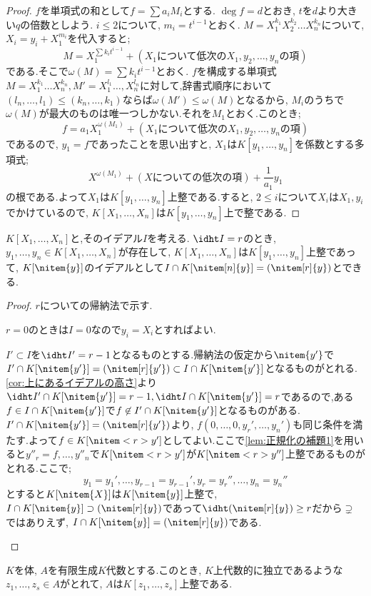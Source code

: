 \begin{proof}
	$f$を単項式の和として$f=\sum a_iM_i$とする. $\deg f=d$とおき, $t$を$d$より大きい$q$の倍数としよう. $i\leq2$について, $m_i=t^{i-1}$とおく. $M=X_1^{k_1}X_2^{k_2}\dots X_n^{k_n}$について, $X_i=y_i+X_1^{m_i}$を代入すると;
	\[M=X_1^{\sum k_it^{i-1}}+(X_1\text{について低次の}X_1,y_2,\dots,y_n\text{の項})\]
	である.そこで$\omega(M)=\sum k_it^{i-1}$とおく. $f$を構成する単項式$M=X_1^{k_1}\dots X_n^{k_n},M'=X_1^{l_1}\dots,X_n^{l_n}$に対して,辞書式順序において$(l_n,\dots,l_1)\leq (k_n,\dots,k_1)$ならば$\omega(M')\leq\omega(M)$となるから, $M_i$のうちで$\omega(M)$が最大のものは唯一つしかない.それを$M_1$とおく.このとき;
	\[f=a_1X_1^{\omega(M_1)}+(X_1\text{について低次の}X_1,y_2,\dots,y_n\text{の項})\]
	であるので, $y_1=f$であったことを思い出すと, $X_1$は$K[y_1,\dots,y_n]$を係数とする多項式;
	\[X^{\omega(M_1)}+(X\text{についての低次の項})+\frac{1}{a_1}y_1\]
	の根である.よって$X_1$は$K[y_1,\dots,y_n]$上整である.すると, $2\leq i$について$X_i$は$X_1,y_i$でかけているので, $K[X_1,\dots,X_n]$は$K[y_1,\dots,y_n]$上で整である.
\end{proof}

\begin{thm}[多項式環の正規化定理]\label{thm:多項式環の正規化定理}
	$K[X_1,\dots,X_n]$と,そのイデアル$I$を考える. $\idht I=r$のとき, $y_1,\dots,y_n\in K[X_1,\dots,X_n]$が存在して, $K[X_1,\dots,X_n]$は$K[y_1,\dots,y_n]$上整であって, $K[\nitem{y}]$のイデアルとして$I\cap K[\nitem[n]{y}]=(\nitem[r]{y})$とできる.
\end{thm}

\begin{proof}
	$r$についての帰納法で示す.
	
	\begin{step}\item $r=0$のときは$I=0$なので$y_i=X_i$とすればよい.
	
	\item	$I'\subset I$を$\idht I'=r-1$となるものとする.帰納法の仮定から$\nitem{y'}$で$I'\cap K[\nitem{y'}]=(\nitem[r]{y'})\subset I\cap K[\nitem{y'}]$となるものがとれる.\ref{cor:上にあるイデアルの高さ}より$\idht I'\cap K[\nitem{y'}]=r-1,\idht I\cap K[\nitem{y'}]=r$であるので,ある$f\in I\cap K[\nitem{y'}]$で$f\not\in I'\cap K[\nitem{y'}]$となるものがある. $I'\cap K[\nitem{y'}]=(\nitem[r]{y'})$より, $f(0,\dots,0,y_r',\dots,y_n')$も同じ条件を満たす.よって$f\in K[\nitem<r>{y'}]$としてよい.ここで\ref{lem:正規化の補題1}を用いると$y''_r=f,\dots,y''_n$で$K[\nitem<r>{y'}]$が$K[\nitem<r>{y''}]$上整であるものがとれる.ここで;
	\[y_1=y_1',\dots,y_{r-1}=y_{r-1}',y_r=y_r'',\dots,y_n=y_n''\]
	とすると$K[\nitem{X}]$は$K[\nitem{y}]$上整で, $I\cap K[\nitem{y}]\supset (\nitem[r]{y})$であって$\idht(\nitem[r]{y})\geq r$だから$\supsetneq$ではありえず, $I\cap K[\nitem{y}]=(\nitem[r]{y})$である.
	\end{step}
\end{proof}
\begin{thm}[Noetherの正規化定理]\label{thm:正規化定理}
	$K$を体, $A$を有限生成$K$代数とする.このとき, $K$上代数的に独立であるような$z_1,\dots,z_s\in A$がとれて, $A$は$K[z_1,\dots,z_s]$上整である.
\end{thm}

